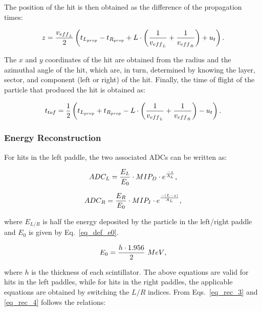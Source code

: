\documentclass{elsart}
\begin{document}
The position of the hit is then obtained as the difference of the propagation times:

\begin{equation}
z=\frac{v_{\rm{eff}_{\rm{L}}}}{2} \left(t_{\rm{L}_{\rm{prop}}}-t_{\rm{R}_{\rm{prop}}}
+ L \cdot \left(\frac{1}{v_{\rm{eff}_{\rm{L}}}}+\frac{1}{v_{\rm{eff}_{\rm{R}}}}\right)  +u_{\rm{t}}\right).
\end{equation}

The $x$ and $y$ coordinates of the hit are obtained from the radius and the azimuthal angle of the hit, which
are, in turn, determined by knowing the layer, sector, and component (left or right) of the hit.  Finally, the time
of flight of the particle that produced the hit is obtained as:

\begin{equation}
t_{\rm{tof}}= \frac{1}{2}\left(t_{\rm{L}_{\rm{prop}}}+t_{\rm{R}_{\rm{prop}}}- L \cdot \left(\frac{1}{v_{\rm{eff}_{\rm{L}}}}
+\frac{1}{v_{\rm{eff}_{\rm{R}}}}\right)  -u_{\rm{t}}\right).
\end{equation}

\subsubsection{Energy Reconstruction}

For hits in the left paddle, the two associated ADCs can be written as:

\begin{equation}
\label{eq_rec_3}
ADC_{\rm{L}}=\frac{E_{\rm{L}}}{E_0}\cdot MIP_{\rm{D}}\cdot e^{\frac{-z}{A_{\rm{L}}}},
\end{equation}

\begin{equation}
\label{eq_rec_4}
ADC_{\rm{R}}=\frac{E_{\rm{R}}}{E_0}\cdot MIP_{\rm{I}}\cdot e^{\frac{-(L-z)}{A_{\rm{L}}}},
\end{equation}

\noindent
where $E_{L/R}$ is half the energy deposited by the particle in the left/right paddle and $E_0$ is given by
Eq.~\ref{eq_def_e0}.

\begin{equation}\label{eq_def_e0}
E_0=\frac{h\cdot 1.956}{2}~\rm{MeV},
\end{equation}

\noindent
where $h$ is the thickness of each scintillator. The above equations are valid for hits in the left paddles, while
for hits in the right paddles, the applicable equations are obtained by switching the $L/R$ indices. From
Eqs.~\ref{eq_rec_3} and \ref{eq_rec_4} follows the relations:
\end{document}
